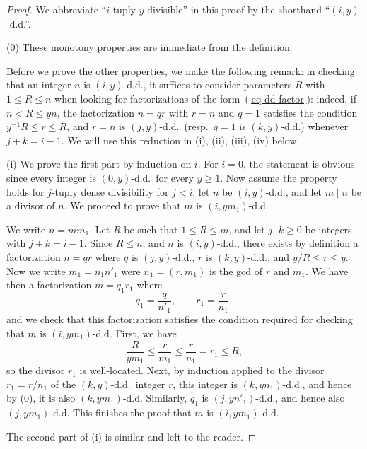 \documentclass[12pt,a4paper,reqno]{amsart}
\numberwithin{equation}{section}
\theoremstyle{plain}
\theoremstyle{definition}
\begin{document}
\begin{proof}  
  We abbreviate ``$i$-tuply $y$-divisible'' in this proof by the
  shorthand ``$(i,y)$-d.d.''.
\par
(0) These monotony properties are immediate from the definition.
\par
Before we prove the other properties, we make the following
remark: in checking that an integer $n$ is $(i,y)$-d.d., it suffices
to consider parameters $R$ with $1\leq R\leq n$ when looking for
factorizations of the form~(\ref{eq-dd-factor}): indeed, if $n<R\leq yn$, the
factorization $n=qr$ with $r=n$ and $q=1$ satisfies the condition
$y^{-1}R\leq r\leq R$, and $r=n$ is $(j,y)$-d.d.\ (resp.\ $q=1$ is
$(k,y)$-d.d.) whenever $j+k=i-1$. We will use this reduction in (i),
(ii), (iii), (iv) below.
\par
(i) We prove the first part by induction on $i$. For $i=0$, the
statement is obvious since every integer is $(0,y)$-d.d.\ for every
$y\geq 1$. Now assume the property holds for $j$-tuply dense
divisibility for $j<i$, let $n$ be $(i,y)$-d.d., and let $m\mid n$
be a divisor of $n$. We proceed to prove that $m$ is $(i,ym_1)$-d.d.
\par
We write $n=mm_1$. Let $R$ be such that $1\leq R\leq m$, and let $j$,
$k\geq 0$ be integers with $j+k=i-1$. Since $R\leq n$, and $n$ is
$(i,y)$-d.d., there exists by definition a factorization $n=qr$ where
$q$ is $(j,y)$-d.d., $r$ is $(k,y)$-d.d., and $y/R\leq r\leq y$. Now we
write $m_1=n_1n'_1$ were $n_1=(r,m_1)$ is the gcd of $r$ and $m_1$. We
have then a factorization $m=q_1r_1$ where
$$
q_1=\frac{q}{n'_1},\quad\quad r_1=\frac{r}{n_1},
$$
and we check that this factorization satisfies the condition required
for checking that $m$ is $(i,ym_1)$-d.d. First, we have
$$
\frac{R}{ym_1}\leq \frac{r}{m_1}\leq \frac{r}{n_1}=r_1\leq R,
$$
so the divisor $r_1$ is well-located. Next, by induction applied to
the divisor $r_1=r/n_1$ of the $(k,y)$-d.d.\ integer $r$, this integer
is $(k,yn_1)$-d.d., and hence by (0), it is also
$(k,ym_1)$-d.d. Similarly, $q_1$ is $(j,yn'_1)$-d.d., and hence also
$(j,ym_1)$-d.d. This finishes the proof that $m$ is $(i,ym_1)$-d.d.
\par
The second part of (i) is similar and left to the reader.
\par

\end{proof}
\end{document}
